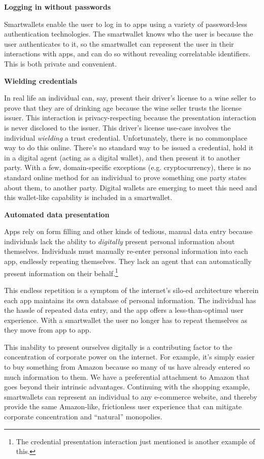 \documentclass[11pt, oneside]{article}   	%
\begin{document}
\textbf{Logging in without passwords}

Smartwallets enable the user to log in to apps using a variety of password-less authentication technologies. The smartwallet knows who the user is because the user authenticates to it, so the smartwallet can represent the user in their interactions with apps, and can do so without revealing correlatable identifiers. This is both private and convenient.

\textbf{Wielding credentials}

In real life an individual can, say, present their driver's license to a wine seller to prove that they are of drinking age because the wine seller trusts the license issuer. This interaction is privacy-respecting because the presentation interaction is never disclosed to the issuer. This driver's license use-case involves the individual \emph{wielding} a trust credential. Unfortunately, there is no commonplace way to do this online. There's no standard way to be issued a credential, hold it in a digital agent (acting as a digital wallet), and then present it to another party. With a few, domain-specific exceptions (e.g. cryptocurrency), there is no standard online method for an individual to prove something one party states about them, to another party. Digital wallets are emerging to meet this need and this wallet-like capability is included in a smartwallet.

\textbf{Automated data presentation}

Apps rely on form filling and other kinds of tedious, manual data entry because individuals lack the ability to \emph{digitally} present personal information about themselves. Individuals must manually re-enter personal information into each app, endlessly repeating themselves. They lack an agent that can automatically present information on their behalf.\footnote{The credential presentation interaction just mentioned is another example of this.} 

This endless repetition is a symptom of the internet's silo-ed architecture wherein each app maintains its own database of personal information. The individual has the hassle of repeated data entry, and the app offers a less-than-optimal user experience. With a smartwallet the user no longer has to repeat themselves as they move from app to app.

This inability to present ourselves digitally is a contributing factor to the concentration of corporate power on the internet. For example, it's simply easier to buy something from Amazon because so many of us have already entered so much information to them. We have a preferential attachment to Amazon that goes beyond their intrinsic advantages. Continuing with the shopping example, smartwallets can represent an individual to any e-commerce website, and thereby provide the same Amazon-like, frictionless user experience that can mitigate corporate concentration and ``natural'' monopolies. 
\end{document}
